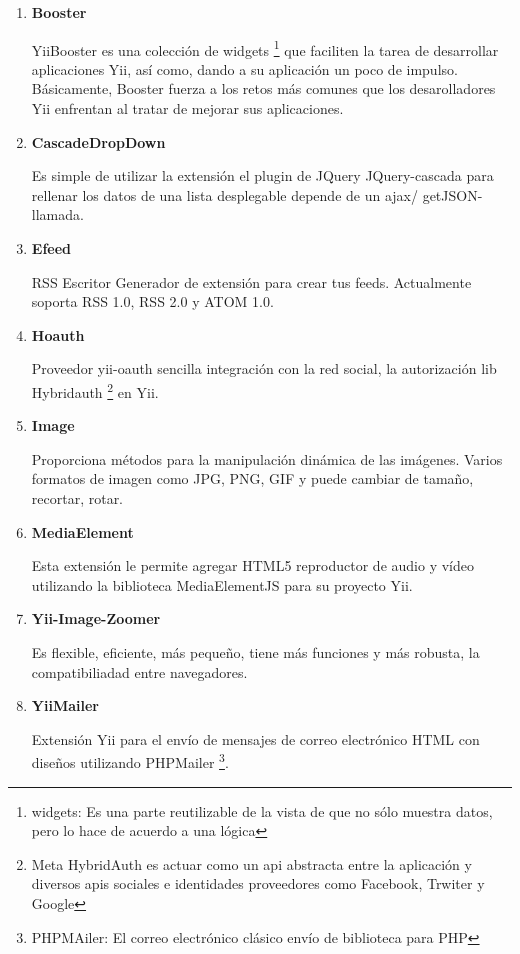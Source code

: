 \begin{enumerate}

\item \textbf{Booster}

YiiBooster es una colecci\'{o}n de widgets \footnote{widgets: Es una parte 
reutilizable de la vista de que no s\'{o}lo muestra datos, pero lo hace de
acuerdo a una l\'{o}gica} que faciliten la tarea de desarrollar aplicaciones
Yii, as\'{i} como, dando a su aplicaci\'{o}n un poco de impulso. B\'{a}sicamente,
Booster fuerza a los retos m\'{a}s comunes que los desarolladores Yii
enfrentan al tratar de mejorar sus aplicaciones. \cite{booster}

\item \textbf{CascadeDropDown}

Es simple de utilizar la extensi\'{o}n el plugin de JQuery JQuery-cascada para
rellenar los datos de una lista desplegable depende de un ajax/ getJSON-llamada.
 \cite{cascadedropdown}

\item \textbf{Efeed}

RSS Escritor Generador de extensi\'{o}n para crear tus feeds. Actualmente soporta
RSS 1.0, RSS 2.0 y ATOM 1.0. \cite{efeed}

\item \textbf{Hoauth}

Proveedor yii-oauth sencilla integraci\'{o}n con la red social, la autorizaci\'{o}n
lib Hybridauth \footnote{Meta HybridAuth es actuar como un api abstracta entre la
aplicaci\'{o}n y diversos apis sociales e identidades proveedores como Facebook, 
Trwiter y Google} en Yii. \cite{hoauth}

\item \textbf{Image}

Proporciona m\'{e}todos para la manipulaci\'{o}n din\'{a}mica de las im\'{a}genes.
Varios formatos de imagen como JPG, PNG, GIF y puede cambiar de tama\~{n}o, recortar,
rotar. \cite{image}

\item \textbf{MediaElement}

Esta extensi\'{o}n le permite agregar HTML5 reproductor de audio y v\'{i}deo 
utilizando la biblioteca MediaElementJS para su proyecto Yii. \cite{mediaelement}

\item \textbf{Yii-Image-Zoomer}

Es flexible, eficiente, m\'{a}s peque\~{n}o, tiene m\'{a}s funciones y m\'{a}s
robusta, la compatibiliadad entre navegadores. \cite{yiiImageZoomer}

\item \textbf{YiiMailer}

Extensi\'{o}n Yii para el env\'{i}o de mensajes de correo electr\'{o}nico HTML
con dise\~{n}os utilizando PHPMailer \footnote{PHPMAiler: El correo electr\'{o}nico
cl\'{a}sico env\'{i}o de biblioteca para PHP}. \cite{yiiMailer}

\end{enumerate}


